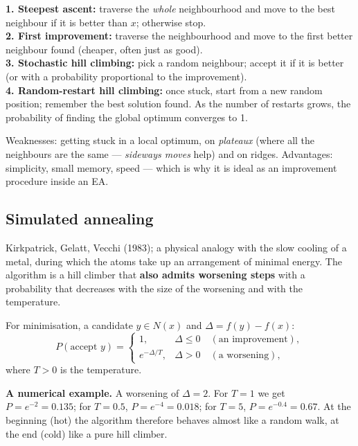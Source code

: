 \documentclass[11pt,a4paper]{article}
\theoremstyle{definition}
\begin{document}
\begin{defbox}
\textbf{1. Steepest ascent:} traverse the \emph{whole} neighbourhood and move to
the best neighbour if it is better than $x$; otherwise stop.\\
\textbf{2. First improvement:} traverse the neighbourhood and move to the first
better neighbour found (cheaper, often just as good).\\
\textbf{3. Stochastic hill climbing:} pick a random neighbour; accept it if it
is better (or with a probability proportional to the improvement).\\
\textbf{4. Random-restart hill climbing:} once stuck, start from a new random
position; remember the best solution found. As the number of restarts grows, the
probability of finding the global optimum converges to 1.
\end{defbox}

Weaknesses: getting stuck in a local optimum, on \emph{plateaux} (where all the
neighbours are the same --- \emph{sideways moves} help) and on ridges.
Advantages: simplicity, small memory, speed --- which is why it is ideal as an
improvement procedure inside an EA.

\subsection{Simulated annealing}

\begin{defbox}
Kirkpatrick, Gelatt, Vecchi (1983); a physical analogy with the slow cooling of
a metal, during which the atoms take up an arrangement of minimal energy. The
algorithm is a hill climber that \textbf{also admits worsening steps} with a
probability that decreases with the size of the worsening and with the
temperature.
\end{defbox}

\begin{defbox}
For minimisation, a candidate $y \in N(x)$ and $\Delta = f(y) - f(x)$:
\[
P(\text{accept } y) =
\begin{cases}
1, & \Delta \le 0 \quad (\text{an improvement}),\\[2pt]
e^{-\Delta / T}, & \Delta > 0 \quad (\text{a worsening}),
\end{cases}
\]
where $T > 0$ is the temperature.
\end{defbox}

\textbf{A numerical example.} A worsening of $\Delta = 2$. For $T = 1$ we get
$P = e^{-2} = 0.135$; for $T = 0.5$, $P = e^{-4} = 0.018$; for $T = 5$,
$P = e^{-0.4} = 0.67$. At the beginning (hot) the algorithm therefore behaves
almost like a random walk, at the end (cold) like a pure hill climber.
\end{document}

